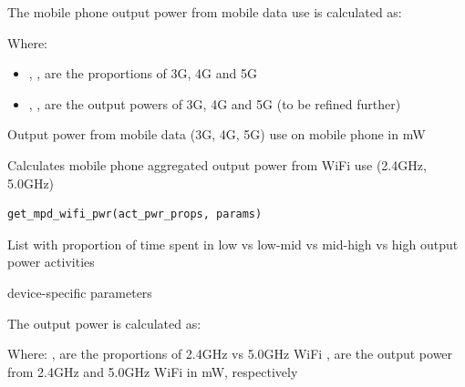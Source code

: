 \documentclass[a4paper]{book}
\begin{document}
%
\begin{Details}
The mobile phone output power from mobile data use is calculated as:

Where:
\begin{itemize}

\item{} , ,  are the proportions of 3G, 4G and 5G
\item{} , ,  are the output powers of 3G, 4G and 5G (to be refined further)

\end{itemize}

\end{Details}
%
\begin{Value}
Output power from mobile data (3G, 4G, 5G) use on mobile phone in mW
\end{Value}
%
\begin{Description}
Calculates mobile phone aggregated output power from WiFi use (2.4GHz, 5.0GHz)
\end{Description}
%
\begin{Usage}
\begin{verbatim}
get_mpd_wifi_pwr(act_pwr_props, params)
\end{verbatim}
\end{Usage}
%
\begin{Arguments}
\begin{ldescription}
\item[\code{act\_pwr\_props}] List with proportion of time spent in low vs low-mid vs mid-high vs high output power activities

\item[\code{params}] device-specific parameters
\end{ldescription}
\end{Arguments}
%
\begin{Details}
The output power is calculated as:


Where:
,  are the proportions of 2.4GHz vs 5.0GHz WiFi
,  are the output power from 2.4GHz and 5.0GHz WiFi in mW, respectively
\end{Details}
\end{document}
